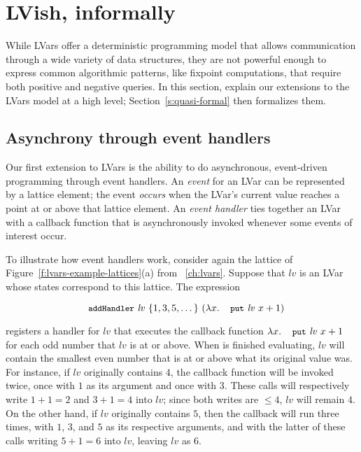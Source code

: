 \section{LVish, informally}\label{s:quasi-informal}

\ifdefined\DISSERTATION
While LVars offer a deterministic programming model that allows
communication through a wide variety of data structures, they are not
powerful enough to express common algorithmic patterns, like fixpoint
computations, that require both positive and negative queries.
\fi
In
this section,  explain our extensions to the LVars model at a high
level; Section~\ref{s:quasi-formal} then formalizes them.

\subsection{Asynchrony through event handlers}

Our first extension to LVars is the ability to do asynchronous,
event-driven programming through event handlers.  An \emph{event} for
an LVar can be represented by a lattice element; the event
\emph{occurs} when the LVar's current value reaches a point at or
above that lattice element.  An \emph{event handler} ties together an
LVar with a callback function that is asynchronously invoked whenever
some events of interest occur.

To illustrate how event handlers work, consider again the lattice of
Figure~\ref{f:lvars-example-lattices}(a) from ~\ref{ch:lvars}.
Suppose that $\mathit{lv}$ is an LVar whose states correspond to this
lattice.  The expression

\singlespacing
\begin{equation}
  \ADDHANDLER~\mathit{lv}~\{ 1, 3, 5, \dots \}~(\lam{x}{\putexp{\mathit{lv}}{x+1}})
\label{e:lvish-example-1}
\end{equation}
\doublespacing

registers a handler for $\mathit{lv}$ that executes the callback
function $\lam{x}{\putexp{\mathit{lv}}{x+1}}$ for each odd number that
$\mathit{lv}$ is at or above.  When  is
finished evaluating, $\mathit{lv}$ will contain the smallest even
number that is at or above what its original value was.  For instance,
if $\mathit{lv}$ originally contains $4$, the callback function will
be invoked twice, once with $1$ as its argument and once with $3$.
These calls will respectively write $1+1 = 2$ and $3+1 = 4$ into
$\mathit{lv}$; since both writes are $\leq 4$, $\mathit{lv}$ will
remain $4$.  On the other hand, if $\mathit{lv}$ originally contains
$5$, then the callback will run three times, with $1$, $3$, and $5$ as
its respective arguments, and with the latter of these calls writing
$5+1 = 6$ into $\mathit{lv}$, leaving $\mathit{lv}$ as $6$.

